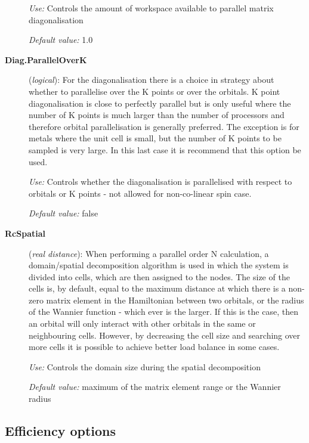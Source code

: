 \documentclass[11pt]{article}
\begin{document}
\begin{description}
{\it Use:} Controls the amount of workspace available to parallel
matrix diagonalisation

{\it Default value:}  1.0

\item[{\bf Diag.ParallelOverK}] ({\it logical}):  For the diagonalisation there is a choice in strategy
about whether to parallelise over the K points or over the orbitals. K
point diagonalisation is close to perfectly parallel but is only
useful where the number of K points is much larger than the number of
processors and therefore orbital parallelisation is generally
preferred. The exception is for metals where the unit cell is small,
but the number of K points to be sampled is very large. In this last
case it is recommend that this option be used.

{\it Use:} Controls whether the diagonalisation is parallelised with
respect to orbitals or K points - not allowed for non-co-linear spin
case.

{\it Default value:}  false

\item[{\bf RcSpatial}] ({\it real distance}):
When performing a parallel order N calculation, a domain/spatial
decomposition algorithm is used in which the system is divided into
cells, which are then assigned to the nodes. The size of the cells
is, by default, equal to the maximum distance at which there is a non-zero 
matrix element in the Hamiltonian between two orbitals, or the
radius of the Wannier function - which ever is the larger. If this is 
the case, then an orbital will only interact with other orbitals in the same
or neighbouring cells. However, by decreasing the cell size and searching
over more cells it is possible to achieve better load balance in some
cases.

{\it Use:} Controls the domain size during the spatial decomposition

{\it Default value:}  maximum of the matrix element range or the Wannier radius

\end{description}


\vspace{5pt}
\subsection{Efficiency options}
\end{document}

